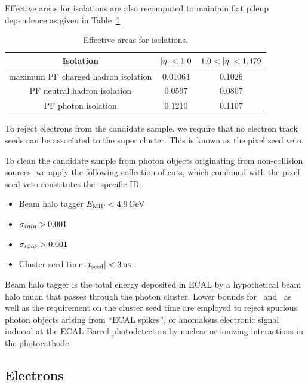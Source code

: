 Effective areas for isolations are also recomputed to maintain flat pileup dependence as given in Table~\ref{tab:ea}
%
\begin{table}[htbp]
  \begin{center}
    \caption{Effective areas for isolations.} 
    \label{tab:ea}
    \begin{tabular}{|c|c|c|}
      \hline
      Isolation & $\lvert \eta \rvert < 1.0$ & $1.0 < \lvert \eta \rvert < 1.479$  \\
      \hline
      maximum PF charged hadron isolation & 0.01064& 0.1026 \\
      PF neutral hadron isolation & 0.0597 & 0.0807 \\
      PF photon isolation & 0.1210 & 0.1107 \\
      \hline
    \end{tabular}
  \end{center}
\end{table}

To reject electrons from the candidate sample, we require that no electron track seeds can be associated to the super cluster. This is known as the pixel seed veto.

To clean the candidate sample from photon objects originating from non-collision sources. we apply the following collection of cuts, which combined with the pixel seed veto constitutes the \Pgg-specific ID:
\begin{itemize} 
  \item Beam halo tagger $E_{\mathrm{MIP}} < 4.9\,\text{Ge\hspace{-.08em}V}$
  \item $\sigma_{i\eta i\eta} > 0.001$
  \item $\sigma_{i\phi i\phi} > 0.001$
  \item Cluster seed time $\lvert t_{\mathrm{seed}} \rvert < 3\, \text{ns}$ .
\end{itemize}
Beam halo tagger is the total energy deposited in ECAL by a hypothetical beam halo muon that passes through the photon cluster. 
Lower bounds for \sieie\ and \sipip\ as well as the requirement on the cluster seed time are employed to reject spurious photon objects arising from ``ECAL spikes'', or anomalous electronic signal induced at the ECAL Barrel photodetectors by nuclear or ionizing interactions in the photocathode.

\subsection{Electrons}
\label{sec:ana_electrons}


